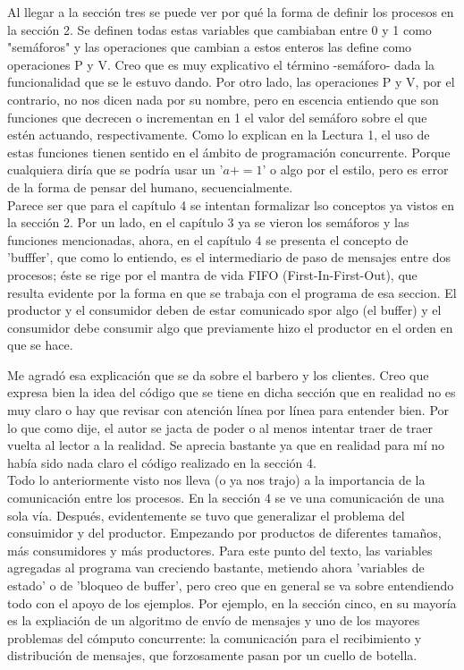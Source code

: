 \documentclass[12pt,a4paper]{article}
\begin{document}
Al llegar a la sección tres se puede ver por qué la forma de definir los procesos en la sección 2. Se definen todas estas variables que cambiaban entre 0 y 1 como "semáforos" y las operaciones que cambian a estos enteros las define como operaciones P y V. Creo que es muy explicativo el término -semáforo- dada la funcionalidad que se le estuvo dando. Por otro lado, las operaciones P y V, por el contrario, no nos dicen nada por su nombre, pero en escencia entiendo que son funciones que decrecen o incrementan en 1 el valor del semáforo sobre el que estén actuando, respectivamente. Como lo explican en la Lectura 1, el uso de estas funciones tienen sentido en el ámbito de programación concurrente. Porque cualquiera diría que se podría usar un '$a += 1$' o algo por el estilo, pero es error de la forma de pensar del humano, secuencialmente.
\\

Parece ser que para el capítulo 4 se intentan formalizar lso conceptos ya vistos en la sección 2. Por un lado, en el capítulo 3 ya se vieron los semáforos y las funciones mencionadas, ahora, en el capítulo 4 se presenta el concepto de 'bufffer', que como lo entiendo, es el intermediario de paso de mensajes entre dos procesos; éste se rige por el mantra de vida FIFO (First-In-First-Out), que resulta evidente por la forma en que se trabaja con el programa de esa seccion. El productor y el consumidor deben de estar comunicado spor algo (el buffer) y el consumidor debe consumir algo que previamente hizo el productor en el orden en que se hace.

Me agradó esa explicación que se da sobre el barbero y los clientes. Creo que expresa bien la idea del código que se tiene en dicha sección que en realidad no es muy claro o hay que revisar con atención línea por línea para entender bien. Por lo que como dije, el autor se jacta de poder o al menos intentar traer de traer vuelta al lector a la realidad. Se aprecia bastante ya que en realidad para mí no había sido nada claro el código realizado en la sección 4.
\\

Todo lo anteriormente visto nos lleva (o ya nos trajo) a la importancia de la comunicación entre los procesos. En la sección 4 se ve una comunicación de una sola vía. Después, evidentemente se tuvo que generalizar el problema del consuimidor y del productor. Empezando por productos de diferentes tamaños, más consumidores y más productores. Para este punto del texto, las variables agregadas al programa van creciendo bastante, metiendo ahora 'variables de estado' o de 'bloqueo de buffer', pero creo que en general se va sobre entendiendo todo con el apoyo de los ejemplos. Por ejemplo, en la sección cinco, en su mayoría es la expliación de un algoritmo de envío de mensajes y uno de los mayores problemas del cómputo concurrente: la comunicación para el recibimiento y distribución de mensajes, que forzosamente pasan por un cuello de botella. 
\\
\end{document}
